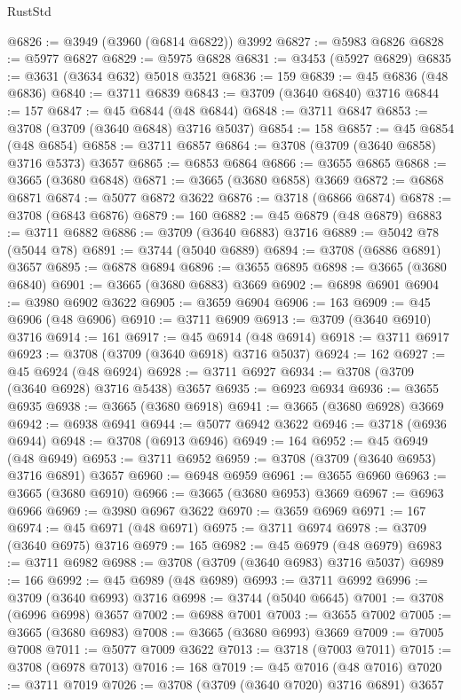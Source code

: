 \begin{lexlean}{RustStd}
\begin{coremodule}
@6826 := @3949 (@3960 (@6814 @6822)) @3992
@6827 := @5983 @6826
@6828 := @5977 @6827
@6829 := @5975 @6828
@6831 := @3453 (@5927 @6829)
@6835 := @3631 (@3634 @632) @5018 @3521
@6836 := 159
@6839 := @45 @6836 (@48 @6836)
@6840 := @3711 @6839
@6843 := @3709 (@3640 @6840) @3716
@6844 := 157
@6847 := @45 @6844 (@48 @6844)
@6848 := @3711 @6847
@6853 := @3708 (@3709 (@3640 @6848) @3716 @5037)
@6854 := 158
@6857 := @45 @6854 (@48 @6854)
@6858 := @3711 @6857
@6864 := @3708 (@3709 (@3640 @6858) @3716 @5373) @3657
@6865 := @6853 @6864
@6866 := @3655 @6865
@6868 := @3665 (@3680 @6848)
@6871 := @3665 (@3680 @6858) @3669
@6872 := @6868 @6871
@6874 := @5077 @6872 @3622
@6876 := @3718 (@6866 @6874)
@6878 := @3708 (@6843 @6876)
@6879 := 160
@6882 := @45 @6879 (@48 @6879)
@6883 := @3711 @6882
@6886 := @3709 (@3640 @6883) @3716
@6889 := @5042 @78 (@5044 @78)
@6891 := @3744 (@5040 @6889)
@6894 := @3708 (@6886 @6891) @3657
@6895 := @6878 @6894
@6896 := @3655 @6895
@6898 := @3665 (@3680 @6840)
@6901 := @3665 (@3680 @6883) @3669
@6902 := @6898 @6901
@6904 := @3980 @6902 @3622
@6905 := @3659 @6904
@6906 := 163
@6909 := @45 @6906 (@48 @6906)
@6910 := @3711 @6909
@6913 := @3709 (@3640 @6910) @3716
@6914 := 161
@6917 := @45 @6914 (@48 @6914)
@6918 := @3711 @6917
@6923 := @3708 (@3709 (@3640 @6918) @3716 @5037)
@6924 := 162
@6927 := @45 @6924 (@48 @6924)
@6928 := @3711 @6927
@6934 := @3708 (@3709 (@3640 @6928) @3716 @5438) @3657
@6935 := @6923 @6934
@6936 := @3655 @6935
@6938 := @3665 (@3680 @6918)
@6941 := @3665 (@3680 @6928) @3669
@6942 := @6938 @6941
@6944 := @5077 @6942 @3622
@6946 := @3718 (@6936 @6944)
@6948 := @3708 (@6913 @6946)
@6949 := 164
@6952 := @45 @6949 (@48 @6949)
@6953 := @3711 @6952
@6959 := @3708 (@3709 (@3640 @6953) @3716 @6891) @3657
@6960 := @6948 @6959
@6961 := @3655 @6960
@6963 := @3665 (@3680 @6910)
@6966 := @3665 (@3680 @6953) @3669
@6967 := @6963 @6966
@6969 := @3980 @6967 @3622
@6970 := @3659 @6969
@6971 := 167
@6974 := @45 @6971 (@48 @6971)
@6975 := @3711 @6974
@6978 := @3709 (@3640 @6975) @3716
@6979 := 165
@6982 := @45 @6979 (@48 @6979)
@6983 := @3711 @6982
@6988 := @3708 (@3709 (@3640 @6983) @3716 @5037)
@6989 := 166
@6992 := @45 @6989 (@48 @6989)
@6993 := @3711 @6992
@6996 := @3709 (@3640 @6993) @3716
@6998 := @3744 (@5040 @6645)
@7001 := @3708 (@6996 @6998) @3657
@7002 := @6988 @7001
@7003 := @3655 @7002
@7005 := @3665 (@3680 @6983)
@7008 := @3665 (@3680 @6993) @3669
@7009 := @7005 @7008
@7011 := @5077 @7009 @3622
@7013 := @3718 (@7003 @7011)
@7015 := @3708 (@6978 @7013)
@7016 := 168
@7019 := @45 @7016 (@48 @7016)
@7020 := @3711 @7019
@7026 := @3708 (@3709 (@3640 @7020) @3716 @6891) @3657

\end{coremodule}
\end{lexlean}
